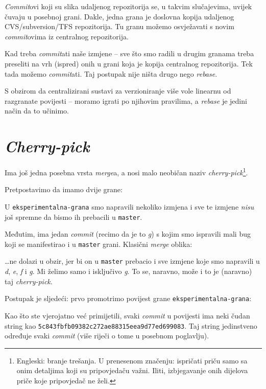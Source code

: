 \emph{Commit}ovi koji su slika udaljenog repozitorija se, u takvim slučajevima, uvijek čuvaju u posebnoj grani.
Dakle, jedna grana je doslovna kopija udaljenog CVS/subversion/TFS repozitorija.
Tu granu možemo osvježavati s novim \emph{commit}ovima iz centralnog repozitorija.

Kad treba \emph{commit}ati naše izmjene -- sve što smo radili u drugim granama treba preseliti na vrh (ispred) onih u grani koja je kopija centralnog repozitorija.
Tek tada možemo \emph{commit}ati.
Taj postupak nije ništa drugo nego \emph{rebase}.

S obzirom da centralizirani sustavi za verzioniranje više vole linearnu od razgranate povijesti -- moramo igrati po njihovim pravilima, a \emph{rebase} je jedini način da to učinimo.

\section*{\emph{Cherry-pick}}

Ima još jedna posebna vrsta \emph{merge}a, a nosi malo neobičan naziv \emph{cherry-pick}\footnote{Engleski: branje trešanja. U prenesenom značenju: ispričati priču samo sa onim detaljima koji su pripovjedaču važni. Iliti, izbjegavanje onih dijelova priče koje pripovjedač ne želi.}.

Pretpostavimo da imamo dvije grane:



U \verb+eksperimentalna-grana+ smo napravili nekoliko izmjena i sve te izmjene \emph{nisu} još spremne da bismo ih prebacili u \verb+master+.

Međutim, ima jedan \emph{commit} (recimo da je to \emph g) s kojim smo ispravili mali bug koji se manifestirao i u \verb+master+ grani.
Klasični \emph{merge} oblika:



\dots{}ne dolazi u obzir, jer bi on u \verb+master+ prebacio i sve izmjene koje smo napravili u \emph d, \emph e, \emph f i \emph g.
Mi želimo samo i isključivo \emph g.
To se, naravno, može i to je (naravno) taj \emph{cherry-pick}.

Postupak je sljedeći: prvo promotrimo povijest grane \verb+eksperimentalna-grana+:



Kao što ste vjerojatno već primijetili, svaki \emph{commit} u povijesti ima neki čudan string kao \verb+5c843fbfb09382c272ae88315eea9d77ed699083+.
Taj string jedinstveno određuje svaki \emph{commit} (više riječi o tome u posebnom poglavlju).

